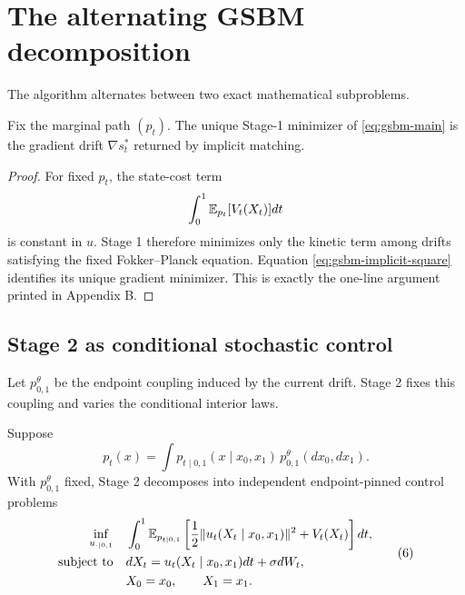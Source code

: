 \section{The alternating GSBM decomposition}
The algorithm alternates between two exact mathematical subproblems.

\begin{proposition}
Fix the marginal path $(p_t)$.  The unique Stage-1 minimizer of
\eqref{eq:gsbm-main} is the gradient drift $\nabla s_t^*$ returned by implicit
matching.
\end{proposition}

\begin{proof}
For fixed $p_t$, the state-cost term
\[
  \int_0^1\mathbb{E}_{p_t}[V_t(X_t)]dt
\]
is constant in $u$.  Stage 1 therefore minimizes only the kinetic term among
drifts satisfying the fixed Fokker--Planck equation.  Equation
\eqref{eq:gsbm-implicit-square} identifies its unique gradient minimizer.
This is exactly the one-line argument printed in Appendix B.
\end{proof}

\subsection{Stage 2 as conditional stochastic control}
Let $p_{0,1}^\theta$ be the endpoint coupling induced by the current drift.  Stage
2 fixes this coupling and varies the conditional interior laws.

\begin{proposition}
Suppose
\[
  p_t(x)=\int p_{t\mid0,1}(x\mid x_0,x_1)
  \,p_{0,1}^\theta(dx_0,dx_1).
\]
With $p_{0,1}^\theta$ fixed, Stage 2 decomposes into independent endpoint-pinned
control problems
\begin{equation}
\begin{aligned}
  \inf_{u_{\cdot\mid0,1}}
  \quad&\int_0^1
  \mathbb{E}_{p_{t\mid0,1}}
  \left[\frac12\|u_t(X_t\mid x_0,x_1)\|^2+V_t(X_t)\right]dt,\\
  \text{subject to}\quad&
  dX_t=u_t(X_t\mid x_0,x_1)dt+\sigma dW_t,\\
  &X_0=x_0,\qquad X_1=x_1.
\end{aligned}
\tag{6}\label{eq:gsbm-cond-soc}
\end{equation}
\end{proposition}

